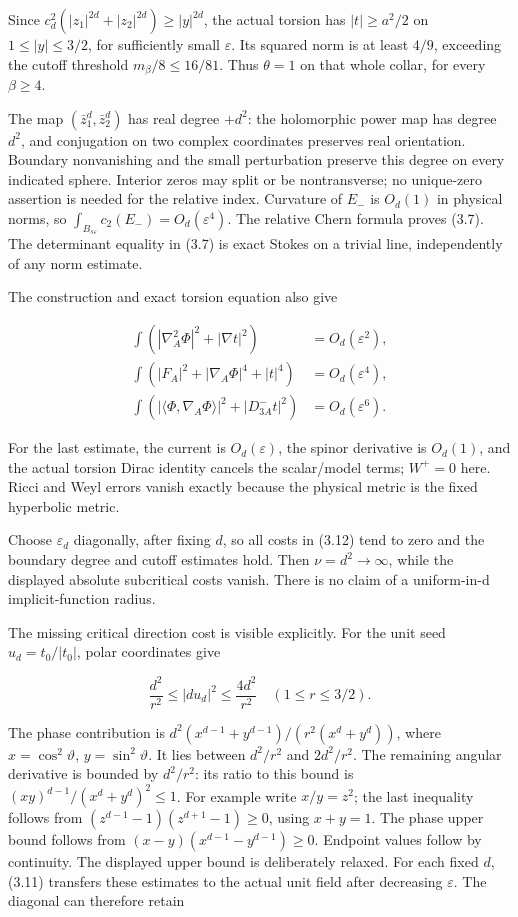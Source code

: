 \documentclass[
  10pt,
]{article}
\begin{document}
Since \(c_d^2(|z_1|^{2d}+|z_2|^{2d})\ge|y|^{2d}\), the actual torsion
has \(|t|\ge a^2/2\) on \(1\le|y|\le3/2\), for sufficiently small
\(\varepsilon\). Its squared norm is at least \(4/9\), exceeding the
cutoff threshold \(m_\beta/8\le16/81\). Thus \(\theta=1\) on that whole
collar, for every \(\beta\ge4\).

The map \((\bar z_1^d,\bar z_2^d)\) has real degree \(+d^2\): the
holomorphic power map has degree \(d^2\), and conjugation on two complex
coordinates preserves real orientation. Boundary nonvanishing and the
small perturbation preserve this degree on every indicated sphere.
Interior zeros may split or be nontransverse; no unique-zero assertion
is needed for the relative index. Curvature of \(E_-\) is \(O_d(1)\) in
physical norms, so
\(\int_{B_{s\varepsilon}}c_2(E_-)=O_d(\varepsilon^4)\). The relative
Chern formula proves (3.7). The determinant equality in (3.7) is exact
Stokes on a trivial line, independently of any norm estimate.

The construction and exact torsion equation also give

\[
 \begin{aligned}
 \int(|\nabla_A^2\Phi|^2+|\nabla t|^2)&=O_d(\varepsilon^2),\\
 \int(|F_A|^2+|\nabla_A\Phi|^4+|t|^4)&=O_d(\varepsilon^4),\\
 \int(|\langle\Phi,\nabla_A\Phi\rangle|^2+|D_{3A}^-t|^2)
                                             &=O_d(\varepsilon^6).
 \end{aligned}
 \tag{3.12}
\]

For the last estimate, the current is \(O_d(\varepsilon)\), the spinor
derivative is \(O_d(1)\), and the actual torsion Dirac identity cancels
the scalar/model terms; \(W^+=0\) here. Ricci and Weyl errors vanish
exactly because the physical metric is the fixed hyperbolic metric.

Choose \(\varepsilon_d\) diagonally, after fixing \(d\), so all costs in
(3.12) tend to zero and the boundary degree and cutoff estimates hold.
Then \(\nu=d^2\to\infty\), while the displayed absolute subcritical
costs vanish. There is no claim of a uniform-in-d implicit-function
radius.

The missing critical direction cost is visible explicitly. For the unit
seed \(u_d=t_0/|t_0|\), polar coordinates give

\[
 \frac{d^2}{r^2}\le|du_d|^2\le\frac{4d^2}{r^2}
                   \quad(1\le r\le3/2).
 \tag{3.13}
\]

The phase contribution is \(d^2(x^{d-1}+y^{d-1})/(r^2(x^d+y^d))\), where
\(x=\cos^2\vartheta\), \(y=\sin^2\vartheta\). It lies between
\(d^2/r^2\) and \(2d^2/r^2\). The remaining angular derivative is
bounded by \(d^2/r^2\): its ratio to this bound is
\((xy)^{d-1}/(x^d+y^d)^2\le1\). For example write \(x/y=z^2\); the last
inequality follows from \((z^{d-1}-1)(z^{d+1}-1)\ge0\), using \(x+y=1\).
The phase upper bound follows from \((x-y)(x^{d-1}-y^{d-1})\ge0\).
Endpoint values follow by continuity. The displayed upper bound is
deliberately relaxed. For each fixed \(d\), (3.11) transfers these
estimates to the actual unit field after decreasing \(\varepsilon\). The
diagonal can therefore retain
\end{document}
